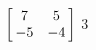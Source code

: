 {$\left[\hskip -3pt \begin{array}{cc} 7&5\\  -5&-4\end {array} \hskip -3pt
 \right] $} 
{$3$}



  

